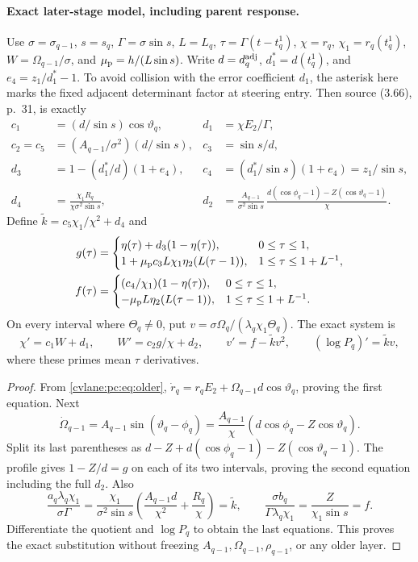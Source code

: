 \paragraph{Exact later-stage model, including parent response.}
Use $\sigma=\sigma_{q-1}$, $s=s_q$, $\Gamma=\sigma\sin s$, $L=L_q$, $\tau=\Gamma(t-t_q^1)$, $\chi=r_q$, $\chi_1=r_q(t_q^1)$, $W=\Omega_{q-1}/\sigma$, and $\mu_{\rm p}=h/(L\sin s)$. Write $d=d_q^{\rm adj}$, $d_1^*=d(t_q^1)$, and $e_4=z_1/d_1^*-1$. To avoid collision with the error coefficient $d_1$, the asterisk here marks the fixed adjacent determinant factor at steering entry. Then source (3.66), p.~31, is exactly
\begin{align}
 c_1&=(d/\sin s)\cos\vartheta_q,&d_1&=\chi E_2/\Gamma,\nonumber\\
 c_2=c_5&=(A_{q-1}/\sigma^2)(d/\sin s),&c_3&=\sin s/d,\nonumber\\
 d_3&=1-(d_1^*/d)(1+e_4),&c_4&=(d_1^*/\sin s)(1+e_4)=z_1/\sin s,\label{cvlane:pc:eq:model-coeff}\\
 d_4&=\frac{\chi_1R_q}{\chi\sigma^2\sin s},&
 d_2&=\frac{A_{q-1}}{\sigma^2\sin s}\,
 \frac{d(\cos\phi_q-1)-Z(\cos\vartheta_q-1)}\chi.\nonumber
\end{align}
Define $\widetilde k=c_5\chi_1/\chi^2+d_4$ and
\begin{align*}
 g(\tau)&=\begin{cases}\eta(\tau)+d_3(1-\eta(\tau)),&0\le\tau\le1,\\
 1+\mu_{\rm p}c_3L\chi_1\eta_2(L(\tau-1)),&1\le\tau\le1+L^{-1},\end{cases}\\
 f(\tau)&=\begin{cases}(c_4/\chi_1)(1-\eta(\tau)),&0\le\tau\le1,\\
 -\mu_{\rm p}L\eta_2(L(\tau-1)),&1\le\tau\le1+L^{-1}.\end{cases}
\end{align*}
On every interval where $\Theta_q\ne0$, put $v=\sigma\Omega_q/(\lambda_q\chi_1\Theta_q)$. The exact system is
\begin{equation}\label{cvlane:pc:eq:model}
 \chi'=c_1W+d_1,\qquad W'=c_2g/\chi+d_2,\qquad
 v'=f-\widetilde k v^2,\qquad (\log P_q)'=\widetilde k v,
\end{equation}
where these primes mean $\tau$ derivatives.
\begin{proof}
From \eqref{cvlane:pc:eq:older}, $\dot r_q=r_qE_2+\Omega_{q-1}d\cos\vartheta_q$, proving the first equation. Next
\[
 \dot\Omega_{q-1}=A_{q-1}\sin(\vartheta_q-\phi_q)
 =\frac{A_{q-1}}\chi(d\cos\phi_q-Z\cos\vartheta_q).
\]
Split its last parentheses as $d-Z+d(\cos\phi_q-1)-Z(\cos\vartheta_q-1)$. The profile gives $1-Z/d=g$ on each of its two intervals, proving the second equation including the full $d_2$. Also
\[
 \frac{a_q\lambda_q\chi_1}{\sigma\Gamma}
 =\frac{\chi_1}{\sigma^2\sin s}
 \left(\frac{A_{q-1}d}{\chi^2}+\frac{R_q}\chi\right)
 =\widetilde k,
 \qquad \frac{\sigma b_q}{\Gamma\lambda_q\chi_1}
 =\frac{Z}{\chi_1\sin s}=f.
\]
Differentiate the quotient and $\log P_q$ to obtain the last equations. This proves the exact substitution without freezing $A_{q-1},\Omega_{q-1},\rho_{q-1}$, or any older layer.
\end{proof}

